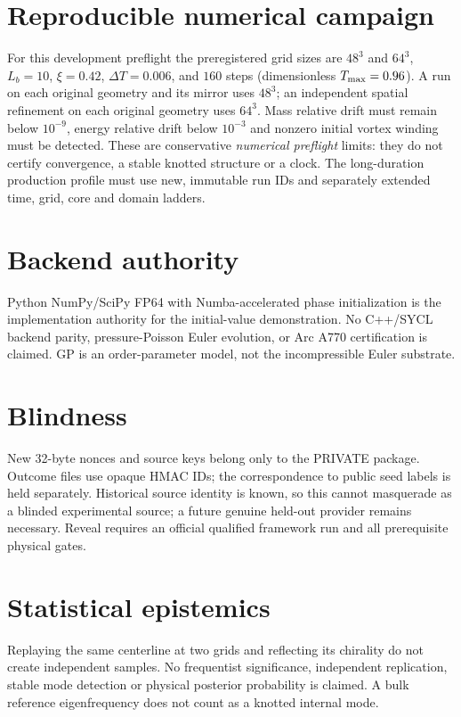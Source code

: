 \documentclass[10pt,a4paper]{article}
\begin{document}
\section{Reproducible numerical campaign}
For this development preflight the preregistered grid sizes are $48^3$ and $64^3$, $L_b=10$, $\xi=0.42$, $\Delta T=0.006$, and $160$ steps (dimensionless $T_{\rm max}=0.96$). A run on each original geometry and its mirror uses $48^3$; an independent spatial refinement on each original geometry uses $64^3$. Mass relative drift must remain below $10^{-9}$, energy relative drift below $10^{-3}$ and nonzero initial vortex winding must be detected. These are conservative \emph{numerical preflight} limits: they do not certify convergence, a stable knotted structure or a clock. The long-duration production profile must use new, immutable run IDs and separately extended time, grid, core and domain ladders.
\section{Backend authority}
Python NumPy/SciPy FP64 with Numba-accelerated phase initialization is the implementation authority for the initial-value demonstration. No C++/SYCL backend parity, pressure-Poisson Euler evolution, or Arc A770 certification is claimed. GP is an order-parameter model, not the incompressible Euler substrate.
\section{Blindness}
New 32-byte nonces and source keys belong only to the PRIVATE package. Outcome files use opaque HMAC IDs; the correspondence to public seed labels is held separately. Historical source identity is known, so this cannot masquerade as a blinded experimental source; a future genuine held-out provider remains necessary. Reveal requires an official qualified framework run and all prerequisite physical gates.
\section{Statistical epistemics}
Replaying the same centerline at two grids and reflecting its chirality do not create independent samples. No frequentist significance, independent replication, stable mode detection or physical posterior probability is claimed. A bulk reference eigenfrequency does not count as a knotted internal mode.
\end{document}
